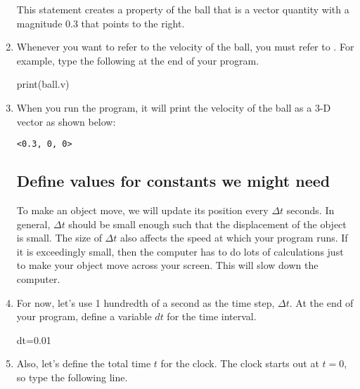 \begin{enumerate}
This statement creates a property of the ball   that is a vector quantity with a magnitude 0.3 that points to the right. 

\item Whenever you want to refer to the velocity of the ball, you must refer to . For example, type the following at the end of your program.

\begin{myvpython}
print(ball.v)
\end{myvpython}

\item When you run the program, it will print the velocity of the ball as a 3-D vector as shown below:

\begin{verbatim}
<0.3, 0, 0>
\end{verbatim}

\subsection*{Define values for constants we might need}

% 
 
To make an object move, we will update its position every $\Delta t$ seconds. In general, $\Delta t$ should be small enough such that the displacement of the object is small. The size of $\Delta t$ also affects the speed at which your program runs. If it is exceedingly small, then the computer has to do lots of calculations just to make your object move across your screen. This will slow down the computer.

\item For now, let's use 1 hundredth of a second as the time step, $\Delta t$. At the end of your program, define a variable $dt$ for the time interval.

\begin{myvpython}
dt=0.01
\end{myvpython}

\item Also, let's define the total time $t$ for the clock. The clock starts out at $t=0$, so type the following line.


\end{enumerate}
